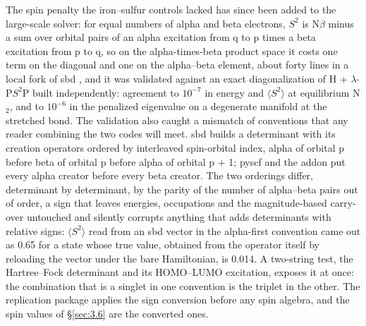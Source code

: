 \documentclass[11pt]{article}
\begin{document}
The spin penalty the iron--sulfur controls lacked has since been added to the large-scale solver: for equal numbers of alpha and beta electrons, $S^{2}$ is N$\beta$ minus a sum over orbital pairs of an alpha excitation from q to p times a beta excitation from p to q, so on the alpha-times-beta product space it costs one term on the diagonal and one on the alpha--beta element, about forty lines in a local fork of sbd \cite{sbd}, and it was validated against an exact diagonalization of H + $\lambda$$\cdot$P$S^{2}$P built independently: agreement to $10^{-7}$ in energy and $\langle S^{2}\rangle$ at equilibrium N$_2$, and to $10^{-6}$ in the penalized eigenvalue on a degenerate manifold at the stretched bond. The validation also caught a mismatch of conventions that any reader combining the two codes will meet. sbd builds a determinant with its creation operators ordered by interleaved spin-orbital index, alpha of orbital p before beta of orbital p before alpha of orbital p + 1; pyscf and the addon put every alpha creator before every beta creator. The two orderings differ, determinant by determinant, by the parity of the number of alpha--beta pairs out of order, a sign that leaves energies, occupations and the magnitude-based carry-over untouched and silently corrupts anything that adds determinants with relative signs: $\langle S^{2}\rangle$ read from an sbd vector in the alpha-first convention came out as 0.65 for a state whose true value, obtained from the operator itself by reloading the vector under the bare Hamiltonian, is 0.014. A two-string test, the Hartree--Fock determinant and its HOMO--LUMO excitation, exposes it at once: the combination that is a singlet in one convention is the triplet in the other. The replication package applies the sign conversion before any spin algebra, and the spin values of \S\ref{sec:3.6} are the converted ones.
\end{document}
